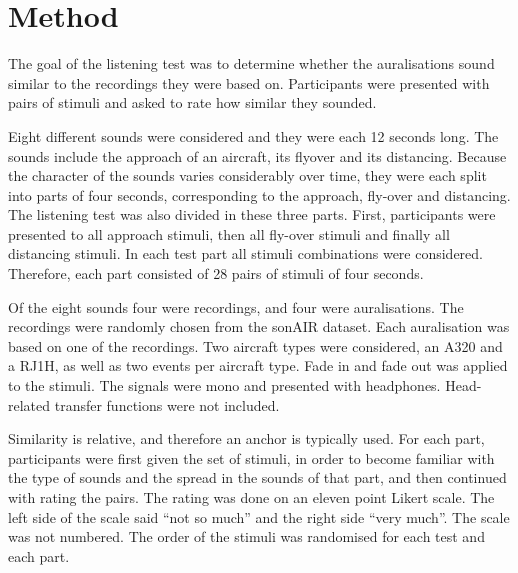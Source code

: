 
\section{Method} %

The goal of the listening test was to determine whether the auralisations sound
similar to the recordings they were based on. Participants were presented with
pairs of stimuli and asked to rate how similar they sounded.


Eight different sounds were considered and they were each 12 seconds long. The
sounds include the approach of an aircraft, its flyover and its distancing.
Because the character of the sounds varies considerably over time, they were
each split into parts of four seconds, corresponding to the approach, fly-over
and distancing. The listening test was also divided in these three parts. First,
participants were presented to all approach stimuli, then all fly-over stimuli
and finally all distancing stimuli. In each test part all stimuli combinations
were considered. Therefore, each part consisted of 28 pairs of stimuli of four
seconds.

Of the eight sounds four were recordings, and four were auralisations.
The recordings were randomly chosen from the sonAIR dataset. Each
auralisation was based on one of the recordings. Two aircraft types were
considered, an A320 and a RJ1H, as well as two events per aircraft type.
Fade in and fade out was applied to the stimuli. The signals were mono and
presented with headphones. Head-related transfer functions were not included.

Similarity is relative, and therefore an anchor is typically used. For each
part, participants were first given the set of stimuli, in order to become
familiar with the type of sounds and the spread in the sounds of that part, and
then continued with rating the pairs. The rating was done on an eleven point
Likert scale. The left side of the scale said ``not so much'' and the right side
``very much''. The scale was not numbered. The order of the stimuli was
randomised for each test and each part.

